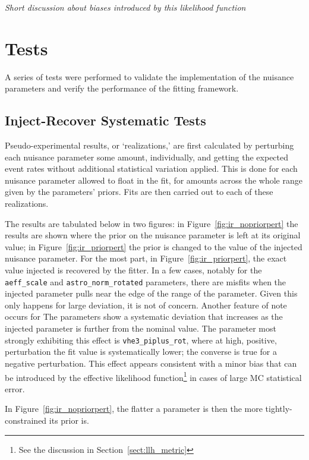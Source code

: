 \documentclass[main.tex]{subfiles}
\begin{document}
\textit{Short discussion about biases introduced by this likelihood function}

\section{Tests}

A series of tests were performed to validate the implementation of the nuisance parameters and verify the performance of the fitting framework. 

\subsection{Inject-Recover Systematic Tests}

Pseudo-experimental results, or `realizations,' are first calculated by perturbing each nuisance parameter some amount, individually, and getting the expected event rates without additional statistical variation applied. 
This is done for each nuisance parameter allowed to float in the fit, for amounts across the whole range given by the parameters' priors. 
Fits are then carried out to each of these realizations.

The results are tabulated below in two figures: in Figure~\ref{fig:ir_nopriorpert} the results are shown where the prior on the nuisance parameter is left at its original value; in Figure~\ref{fig:ir_priorpert} the prior is changed to the value of the injected nuisance parameter. 
For the most part, in Figure~\ref{fig:ir_priorpert}, the exact value injected is recovered by the fitter. 
In a few cases, notably for the \texttt{aeff\_scale} and \texttt{astro\_norm\_rotated} parameters, there are misfits when the injected parameter pulls near the edge of the range of the parameter.
Given this only happens for large deviation, it is not of concern. 
Another feature of note occurs for
The parameters show a systematic deviation that increases as the injected parameter is further from the nominal value. 
The parameter most strongly exhibiting this effect is \texttt{vhe3\_piplus\_rot}, where at high, positive, perturbation the fit value is systematically lower; the converse is true for a negative perturbation. 
This effect appears consistent with a minor bias that can be introduced by the effective likelihood function\footnote{See the discussion in Section~\ref{sect:llh_metric}} in cases of large MC statistical error.  

In Figure~\ref{fig:ir_nopriorpert}, the flatter a parameter is then the more tightly-constrained its prior is. 
\end{document}
